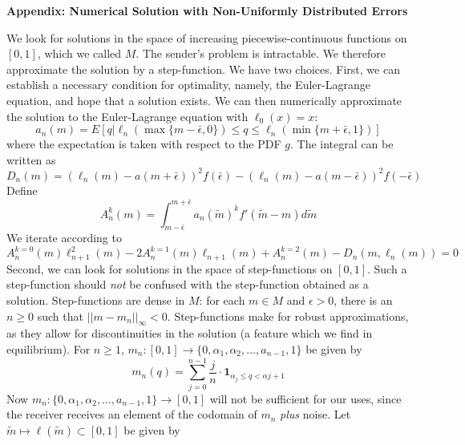 \documentclass[12pt]{article}
\begin{document}
\begin{center}
\textbf{Appendix: Numerical Solution with Non-Uniformly Distributed Errors}
\end{center}
\onehalfspacing
We look for solutions in the space of increasing piecewise-continuous functions on $[0,1]$, which we called $M$. The sender's problem is intractable. We therefore approximate the solution by a step-function. We have two choices. First, we can establish a necessary condition for optimality, namely, the Euler-Lagrange equation, and hope that a solution exists. We can then numerically approximate the solution to the Euler-Lagrange equation with $\ell_{0}(x)=x$: 
\begin{equation}
a_{n}(m)=E[q|\ell_{n}(\max\{m-\bar{\epsilon},0\})\leq q\leq\ell_{n}(\min\{m+\bar{\epsilon},1\})]
\end{equation}
where the expectation is taken with respect to the PDF $g$. The integral can be written as 
\begin{equation}
D_{n}(m)=(\ell_{n}(m)-a(m+\bar{\epsilon}))^{2}f(\bar{\epsilon})-(\ell_{n}(m)-a(m-\bar{\epsilon}))^{2}f(-\bar{\epsilon})
\end{equation}
Define
\begin{equation}
A_{n}^{k}(m)=\int_{m-\bar{\epsilon}}^{m+\bar{\epsilon}}{a_{n}(\tilde{m})^{k}f'(\tilde{m}-m)d\tilde{m}}
\end{equation}
We iterate according to
\begin{equation}
A_{n}^{k=0}(m)\ell_{n+1}^{2}(m)-2A_{n}^{k=1}(m)\ell_{n+1}(m)+A_{n}^{k=2}(m)-D_{n}(m,\ell_{n}(m))=0
\end{equation}
Second, we can look for solutions in the space of step-functions on $[0,1]$. Such a step-function should \textit{not} be confused with the step-function obtained as a solution. Step-functions are dense in $M$: for each $m\in M$ and $\epsilon>0$, there is an $n\geq0$ such that $||m-m_{n}||_{\infty}<0$. Step-functions make for robust approximations, as they allow for discontinuities in the solution (a feature which we find in equilibrium). For $n\geq 1$, $m_{n}:[0,1]\rightarrow\{0,\alpha_{1},\alpha_{2},\ldots,a_{n-1},1\}$ be given by
\begin{equation}
m_{n}(q)=\sum_{j=0}^{n-1}{\frac{j}{n}\cdot\mathbf{1}_{\alpha_{j}\leq q<\alpha{j+1}}}
\end{equation} 
Now $m_{n}:\{0,\alpha_{1},\alpha_{2},\ldots,a_{n-1},1\}\rightarrow[0,1]$ will not be sufficient for our uses, since the receiver receives an element of the codomain of $m_{n}$ \textit{plus} noise. Let $\tilde{m}\mapsto\ell(\tilde{m})\subset[0,1]$ be given by
\end{document}
